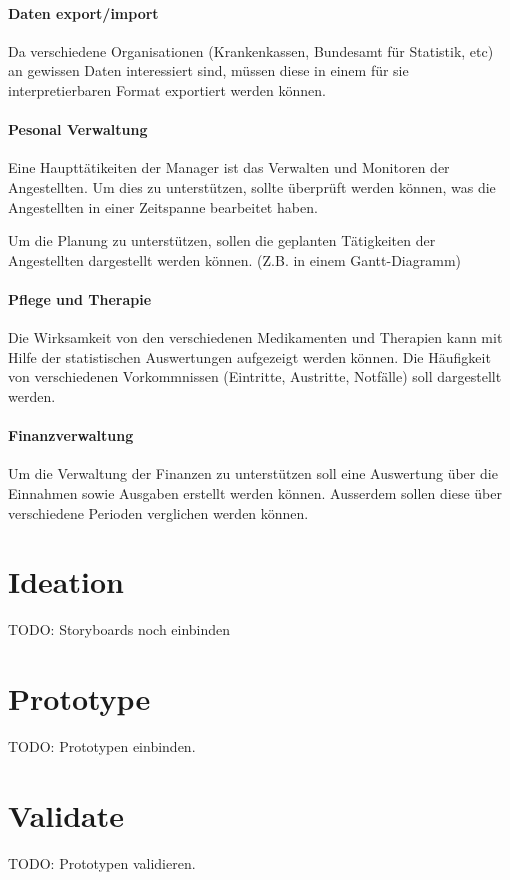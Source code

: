 \documentclass[a4paper]{scrreprt}
\begin{document}
\paragraph{Daten export/import}
Da verschiedene Organisationen (Krankenkassen, Bundesamt für Statistik, etc) an gewissen Daten interessiert sind, müssen diese in einem für sie interpretierbaren Format exportiert werden können. 

\paragraph{Pesonal Verwaltung}
Eine Haupttätikeiten der Manager ist das Verwalten und Monitoren der Angestellten. Um dies zu unterstützen, sollte überprüft werden können, was die Angestellten in einer Zeitspanne bearbeitet haben. 

Um die Planung zu unterstützen, sollen die geplanten Tätigkeiten der Angestellten dargestellt werden können. (Z.B. in einem Gantt-Diagramm)

\paragraph{Pflege und Therapie}
Die Wirksamkeit von den verschiedenen Medikamenten und Therapien kann mit Hilfe der statistischen Auswertungen aufgezeigt werden können. Die Häufigkeit von verschiedenen Vorkommnissen (Eintritte, Austritte, Notfälle) soll dargestellt werden. 

\paragraph{Finanzverwaltung}
Um die Verwaltung der Finanzen zu unterstützen soll eine Auswertung über die Einnahmen sowie Ausgaben erstellt werden können. Ausserdem sollen diese über verschiedene Perioden verglichen werden können.


\section{Ideation}
TODO: Storyboards noch einbinden


\section{Prototype}
TODO: Prototypen einbinden.


\section{Validate}
TODO: Prototypen validieren.
\end{document}
